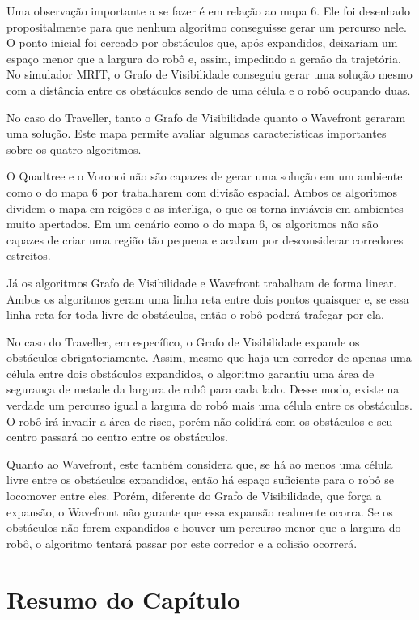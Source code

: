 Uma observação importante a se fazer é em relação ao mapa 6. Ele foi desenhado propositalmente para que nenhum algoritmo conseguisse gerar um percurso nele. O ponto inicial foi cercado por obstáculos que, após expandidos, deixariam um espaço menor que a largura do robô e, assim, impedindo a geraão da trajetória. No simulador MRIT, o Grafo de Visibilidade conseguiu gerar uma solução mesmo com a distância entre os obstáculos sendo de uma célula e o robô ocupando duas.

No caso do Traveller, tanto o Grafo de Visibilidade quanto o Wavefront geraram uma solução. Este mapa permite avaliar algumas características importantes sobre os quatro algoritmos.

O Quadtree e o Voronoi não são capazes de gerar uma solução em um ambiente como o do mapa 6 por trabalharem com divisão espacial. Ambos os algoritmos dividem o mapa em reigões e as interliga, o que os torna inviáveis em ambientes muito apertados. Em um cenário como o do mapa 6, os algoritmos não são capazes de criar uma região tão pequena e acabam por desconsiderar corredores estreitos.

Já os algoritmos Grafo de Visibilidade e Wavefront trabalham de forma linear. Ambos os algoritmos geram uma linha reta entre dois pontos quaisquer e, se essa linha reta for toda livre de obstáculos, então o robô poderá trafegar por ela.

No caso do Traveller, em específico, o Grafo de Visibilidade expande os obstáculos obrigatoriamente. Assim, mesmo que haja um corredor de apenas uma célula entre dois obstáculos expandidos, o algoritmo garantiu uma área de segurança de metade da largura de robô para cada lado. Desse modo, existe na verdade um percurso igual a largura do robô mais uma célula entre os obstáculos. O robô irá invadir a área de risco, porém não colidirá com os obstáculos e seu centro passará no centro entre os obstáculos.

Quanto ao Wavefront, este também considera que, se há ao menos uma célula livre entre os obstáculos expandidos, então há espaço suficiente para o robô se locomover entre eles. Porém, diferente do Grafo de Visibilidade, que força a expansão, o Wavefront não garante que essa expansão realmente ocorra. Se os obstáculos não forem expandidos e houver um percurso menor que a largura do robô, o algoritmo tentará passar por este corredor e a colisão ocorrerá.

\section{Resumo do Capítulo}

